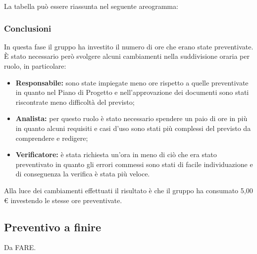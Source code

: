 			La tabella può essere riassunta nel seguente areogramma:


		\subsubsection*{Conclusioni}
			In questa fase il gruppo ha investito il numero di ore che erano state preventivate. È stato necessario però svolgere alcuni cambiamenti nella suddivisione oraria per ruolo, in particolare:
			\begin{itemize}
				\item \textbf{Responsabile:} sono state impiegate meno ore rispetto a quelle preventivate in quanto nel Piano di Progetto e nell'approvazione dei documenti sono stati riscontrate meno difficoltà del previsto;	  \item \textbf{Analista:} per questo ruolo è stato necessario spendere un paio di ore in più in quanto alcuni requisiti e casi d'uso sono stati più complessi del previsto da comprendere e redigere;
				\item \textbf{Verificatore:} è stata richiesta un'ora in meno di ciò che era stato preventivato in quanto gli errori commessi sono stati di facile individuazione e di conseguenza la verifica è stata più veloce.
			\end{itemize}
			Alla luce dei cambiamenti effettuati il risultato è che il gruppo ha consumato 5,00 € investendo le stesse ore preventivate.
		

		\subsection{Preventivo a finire}
			Da FARE.
			
			
			
			